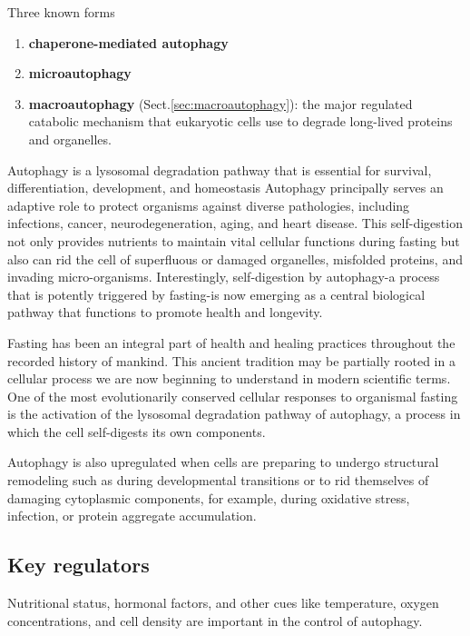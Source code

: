 Three known forms
\begin{enumerate}
  \item {\bf chaperone-mediated autophagy}

  \item {\bf microautophagy}

  \item {\bf macroautophagy} (Sect.\ref{sec:macroautophagy}): the major
  regulated catabolic mechanism that eukaryotic cells use to degrade long-lived
  proteins and organelles.
\end{enumerate}

Autophagy is a lysosomal degradation pathway that is essential for survival,
differentiation, development, and homeostasis Autophagy principally serves an
adaptive role to protect organisms against diverse pathologies, including
infections, cancer, neurodegeneration, aging, and heart disease.
This self-digestion not only provides nutrients to maintain vital cellular
functions during fasting but also can rid the cell of superfluous or damaged
organelles, misfolded proteins, and invading micro-organisms. Interestingly,
self-digestion by autophagy-a process that is potently triggered by fasting-is
now emerging as a central biological pathway that functions to promote health
and longevity.

\begin{mdframed}
Fasting has been an integral part of health and healing practices throughout the
recorded history of mankind. This ancient tradition may be partially rooted in a
cellular process we are now beginning to understand in modern scientific terms.
One of the most evolutionarily conserved cellular responses to organismal
fasting is the activation of the lysosomal degradation pathway of autophagy, a
process in which the cell self-digests its own components.
\end{mdframed}

Autophagy is also upregulated when cells are preparing to undergo structural
remodeling such as during developmental transitions or to rid themselves of
damaging cytoplasmic components, for example, during oxidative stress,
infection, or protein aggregate accumulation.

\subsection{Key regulators}
\label{sec:autophagy-regulators}

Nutritional status, hormonal factors, and other cues like temperature, oxygen
concentrations, and cell density are important in the control of autophagy.

